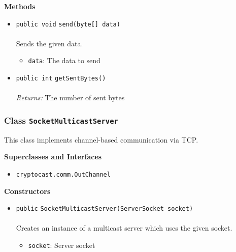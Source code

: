 \textbf{\sffamily Methods}
\begin{itemize}
\item \lstinline|public void| \lstinline|send|\lstinline|(byte[] data)|\\ \\[-0.6em]
Sends the given data.
\begin{itemize}
\item \lstinline|data|: The data to send
\end{itemize}



\item \lstinline|public int| \lstinline|getSentBytes|\lstinline|()|\\ \\[-0.6em]
\emph{Returns:} The number of sent bytes



\end{itemize}

\subsubsection{Class \lstinline|SocketMulticastServer|}
This class implements channel-based communication via TCP. \\
\noindent\begin{minipage}[t]{5cm}
\vspace{0.3em}
\hspace*{2em}
\vspace{0.3em}
\end{minipage}



\textbf{\sffamily Superclasses and Interfaces}
\begin{itemize}
\item \lstinline|cryptocast.comm.OutChannel|
\end{itemize}


\textbf{\sffamily Constructors}
\begin{itemize}
\item \lstinline|public| \lstinline|SocketMulticastServer|\lstinline|(ServerSocket socket)|\\ \\[-0.6em]
Creates an instance of a multicast server which uses the given socket.
\begin{itemize}
\item \lstinline|socket|: Server socket
\end{itemize}



\end{itemize}


